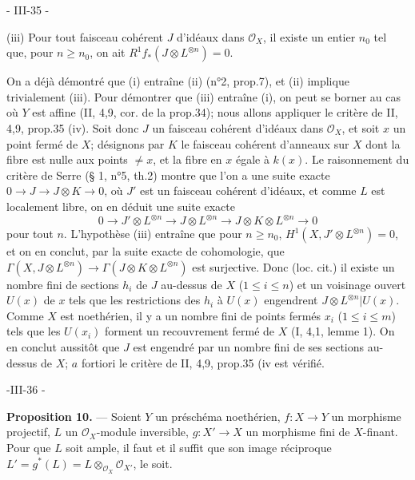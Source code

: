 - III-35 -

(iii) Pour tout faisceau cohérent $J$ d'idéaux dans $\mathcal{O}_X$, il existe un entier $n_0$ tel que, pour $n \ge n_0$, on ait $R^1f_*(J \otimes L^{\otimes n}) = 0$.

On a déjà démontré que (i) entraîne (ii) (n°2, prop.7), et (ii) implique trivialement (iii). Pour démontrer que (iii) entraîne (i), on peut se borner au cas où $Y$ est affine (II, 4,9, cor. de la prop.34); nous allons appliquer le critère de II, 4,9, prop.35 (iv). Soit donc $J$ un faisceau cohérent d'idéaux dans $\mathcal{O}_X$, et soit $x$ un point fermé de $X$; désignons par $K$ le faisceau cohérent d'anneaux sur $X$ dont la fibre est nulle aux points $\neq x$, et la fibre en $x$ égale à $k(x)$. Le raisonnement du critère de Serre (§ 1, n°5, th.2) montre que l'on a une suite exacte $0 \to J \to J \otimes K \to 0$, où $J'$ est un faisceau cohérent d'idéaux, et comme $L$ est localement libre, on en déduit une suite exacte
$$0 \to J' \otimes L^{\otimes n} \to J \otimes L^{\otimes n} \to J \otimes K \otimes L^{\otimes n} \to 0$$
pour tout $n$. L'hypothèse (iii) entraîne que pour $n \ge n_0$, $H^1(X, J' \otimes L^{\otimes n}) = 0$, et on en conclut, par la suite exacte de cohomologie, que $\Gamma(X, J \otimes L^{\otimes n}) \to \Gamma(J \otimes K \otimes L^{\otimes n})$ est surjective. Donc (loc. cit.) il existe un nombre fini de sections $h_i$ de $J$ au-dessus de $X$ ($1 \le i \le n$) et un voisinage ouvert $U(x)$ de $x$ tels que les restrictions des $h_i$ à $U(x)$ engendrent $J \otimes L^{\otimes n} | U(x)$. Comme $X$ est noethérien, il y a un nombre fini de points fermés $x_i$ ($1 \le i \le m$) tels que les $U(x_i)$ forment un recouvrement fermé de $X$ (I, 4,1, lemme 1). On en conclut aussitôt que $J$ est engendré par un nombre fini de ses sections au-dessus de $X$; $a$ fortiori le critère de II, 4,9, prop.35 (iv est vérifié.


\newpage


-III-36 -

\textbf{Proposition 10.} — Soient $Y$ un préschéma noethérien, $f: X \to Y$ un morphisme projectif, $L$ un $\mathcal{O}_X$-module inversible, $g: X' \to X$ un morphisme fini de $X$-finant. Pour que $L$ soit ample, il faut et il suffit que son image réciproque $L' = g^*(L) = L \otimes_{\mathcal{O}_X} \mathcal{O}_{X'}$, le soit.

